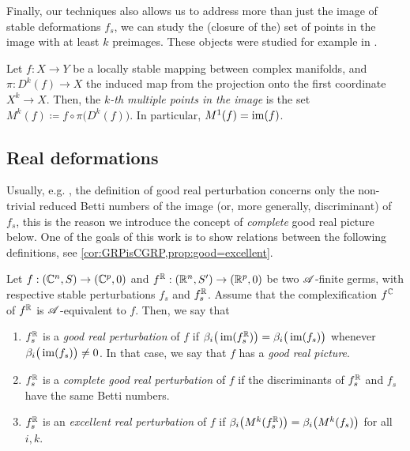 \documentclass[a4paper,12pt]{amsart}
\begin{document}
Finally, our techniques also allows us to address more than just the image of stable deformations $f_s$, we can study the (closure of the) set of points in the image with at least $k$ preimages. These objects were studied for example in \cite{Houston2001,Houston2002,Houston2002a}.

\begin{definition}
Let $f\colon X\rightarrow Y$ be a locally stable mapping between complex manifolds, and $\pi:D^k(f)\to X$ the induced map from the projection onto the first coordinate $X^k\to X$. Then, the \textit{$k$-th multiple points in the image} is the set $M^k(f)\coloneqq f\circ\pi\big(D^k(f)\big)$. In particular, $M^1(f)=\operatorname{im}(f)$.
\end{definition}





\subsection{Real deformations}

Usually, e.g. \cite{Mond1996,Cooper1998,Cooper2002,Houston2002a}, the definition of good real perturbation concerns only the non-trivial reduced Betti numbers of the image (or, more generally, discriminant) of $f_s$, this is the reason we introduce the concept of \textsl{complete} good real picture below. One of the goals of this work is to show relations between the following definitions, see \cref{cor:GRPisCGRP,prop:good=excellent}.

\begin{definition}\label{def:grp}
Let $f:(\mathbb{C}^n,S)\to(\mathbb{C}^p,0)$ and $f^{\mathbb{R}}:(\mathbb{R}^n,S')\to(\mathbb{R}^p,0)$ be two $\mathscr{A}$-finite germs, with respective stable perturbations $f_s$ and $f^{\mathbb{R}}_s$. Assume that the complexification $f^{\mathbb{C}}$ of $f^{\mathbb{R}}$ is $\mathscr{A}$-equivalent to $f$. Then, we say that
\begin{enumerate}[label=(\roman*)]
	\item $f^{\mathbb{R}}_s$ is a \textit{good real perturbation} of $f$ if $\beta_i\big(\operatorname{im}(f^{\mathbb{R}}_s)\big)=\beta_i\big(\operatorname{im}(f_s)\big)$ whenever $\beta_i\big(\operatorname{im}(f_s)\big)\neq0$. In that case, we say that $f$ has a \textit{good real picture}.
   \item $f^{\mathbb{R}}_s$ is a \textit{complete good real perturbation} of $f$ if  the discriminants of $f^{\mathbb{R}}_s$ and $f_s$ have the same Betti numbers.
   \item $f^{\mathbb{R}}_s$ is an \textit{excellent real perturbation} of $f$ if $\beta_i\big(M^k(f^{\mathbb{R}}_s)\big)=\beta_i\big(M^k(f_s)\big)$ for all $i,k$.
\end{enumerate}
\end{definition}
\end{document}
